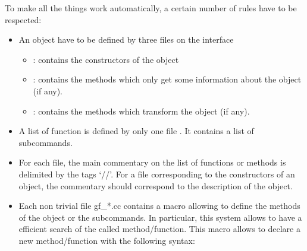 \documentclass[a4paper,11pt,english]{sphinxmanual}
\begin{document}
To make all the things work automatically, a certain number of rules have to be respected:
\begin{itemize}
\item {} 
An object have to be defined by three files on the interface
\begin{itemize}
\item {} 
 : contains the constructors of the object

\item {} 
 : contains the methods which only get some information about the object (if any).

\item {} 
 : contains the methods which transform the object (if any).

\end{itemize}

\item {} 
A list of function is defined by only one file .
It contains a list of sub\sphinxhyphen{}commands.

\item {} 
For each file, the main commentary on the list of functions or methods is delimited by the tags ‘//’. For a file corresponding to the constructors of an object, the commentary should correspond to the description of the object.

\item {} 
Each non trivial file gf\_*.cc contains a macro allowing to define the
methods of the object or the sub\sphinxhyphen{}commands. In particular, this system
allows to have a efficient search of the called method/function.
This macro allows to declare
a new method/function with the following syntax:

\begin{sphinxVerbatim}[commandchars=\\\{\}]
    
     
\end{sphinxVerbatim}


\end{itemize}
\end{document}
